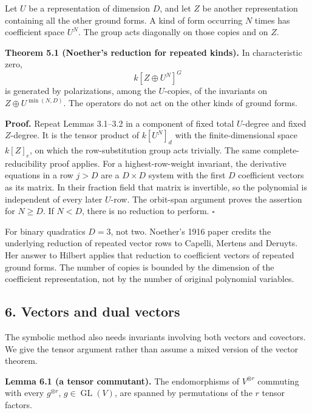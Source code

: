 \documentclass[
]{article}
\begin{document}
Let \(U\) be a representation of dimension \(D\), and let \(Z\) be
another representation containing all the other ground forms. A kind of
form occurring \(N\) times has coefficient space \(U^N\). The group acts
diagonally on those copies and on \(Z\).

\protect{}\label{theorem-5-1}{}

\textbf{Theorem 5.1 (Noether's reduction for repeated kinds).} In
characteristic zero, \[
k [Z\oplus U^N]^G
\] is generated by polarizations, among the \(U\)-copies, of the
invariants on \(Z\oplus U^{\min(N,D)}\). The operators do not act on the
other kinds of ground forms.

\textbf{Proof.} Repeat Lemmas 3.1--3.2 in a component of fixed total
\(U\)-degree and fixed \(Z\)-degree. It is the tensor product of
\(k [U^N]_d\) with the finite-dimensional space \(k [Z]_e\), on which
the row-substitution group acts trivially. The same
complete-reducibility proof applies. For a highest-row-weight invariant,
the derivative equations in a row \(j>D\) are a \(D\times D\) system
with the first \(D\) coefficient vectors as its matrix. In their
fraction field that matrix is invertible, so the polynomial is
independent of every later \(U\)-row. The orbit-span argument proves the
assertion for \(N\geq D\). If \(N<D\), there is no reduction to perform.
\(\square\)

For binary quadratics \(D=3\), not two. Noether's 1916 paper credits the
underlying reduction of repeated vector rows to Capelli, Mertens and
Deruyts. Her answer to Hilbert applies that reduction to coefficient
vectors of repeated ground forms. The number of copies is bounded by the
dimension of the coefficient representation, not by the number of
original polynomial variables.

\subsection{6. Vectors and dual vectors}\label{section-6}

The symbolic method also needs invariants involving both vectors and
covectors. We give the tensor argument rather than assume a mixed
version of the vector theorem.

\protect{}\label{lemma-6-1}{}

\textbf{Lemma 6.1 (a tensor commutant).} The endomorphisms of
\(V^{\otimes r}\) commuting with every \(g^{\otimes r}\),
\(g\in\operatorname{GL}(V)\), are spanned by permutations of the \(r\)
tensor factors.
\end{document}

